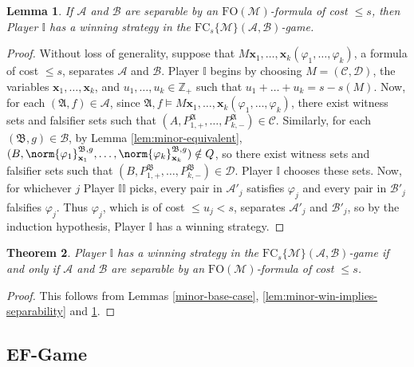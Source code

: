 \documentclass{article}
\newtheorem{theorem}{Theorem}[section]
\newtheorem{lemma}[theorem]{Lemma}
\theoremstyle{definition}
\begin{document}
\begin{lemma}\label{lem:separability-implies-minor-win}
    If $\mathcal{A}$ and $\mathcal{B}$ are separable by an $\mathrm{FO}(\mathcal{M})$-formula of cost $\leq s$, then Player $\mathbb{I}$ has a winning strategy in the $\mathrm{FC}_s\{\mathcal{M}\}(\mathcal{A},\mathcal{B})$-game.
\end{lemma}
\begin{proof}
    Without loss of generality, suppose that $M\textbf{x}_1,\dots,\textbf{x}_k(\varphi_1,\dots,\varphi_k)$, a formula of cost $\leq s$, separates $\mathcal{A}$ and $\mathcal{B}$. Player $\mathbb{I}$ begins by choosing $M=(\mathcal{C},\mathcal{D})$, the variables $\textbf{x}_1,\dots,\textbf{x}_k$, and $u_1,\dots,u_k\in\mathbb{Z}_+$ such that $u_1+\dots+u_k=s-s(M)$. Now, for each $(\mathfrak{A},f)\in\mathcal{A}$, since $\mathfrak{A},f\models M\textbf{x}_1,\dots,\textbf{x}_k(\varphi_1,\dots,\varphi_k)$, there exist witness sets and falsifier sets such that $(A,P^\mathfrak{A}_{1,+},\dots,P^\mathfrak{A}_{k,-})\in \mathcal{C}$. Similarly, for each $(\mathfrak{B},g)\in\mathcal{B}$, by Lemma \ref{lem:minor-equivalent}, $(B,\norm{\varphi_1}^{\mathfrak{B},g}_{\textbf{x}_1},\dots,\norm{\varphi_k}^{\mathfrak{B},g}_{\textbf{x}_k})\notin Q$, so there exist witness sets and falsifier sets such that $(B,P^\mathfrak{B}_{1,+},\dots,P^\mathfrak{B}_{k,-})\in \mathcal{D}$. Player $\mathbb{I}$ chooses these sets. Now, for whichever $j$ Player $\mathbb{II}$ picks, every pair in $\mathcal{A}'_j$ satisfies $\varphi_j$ and every pair in $\mathcal{B}'_j$ falsifies $\varphi_j$. Thus $\varphi_j$, which is of cost $\leq u_j<s$, separates $\mathcal{A}'_j$ and $\mathcal{B}'_j$, so by the induction hypothesis, Player $\mathbb{I}$ has a winning strategy.
\end{proof}

\begin{theorem}
    Player $\mathbb{I}$ has a winning strategy in the $\mathrm{FC}_s\{\mathcal{M}\}(\mathcal{A},\mathcal{B})$-game if and only if $\mathcal{A}$ and $\mathcal{B}$ are separable by an $\mathrm{FO}(\mathcal{M})$-formula of cost $\leq s$.
\end{theorem}
\begin{proof}
    This follows from Lemmas \ref{minor-base-case}, \ref{lem:minor-win-implies-separability} and \ref{lem:separability-implies-minor-win}.
\end{proof}

\subsection{EF-Game}
\end{document}
